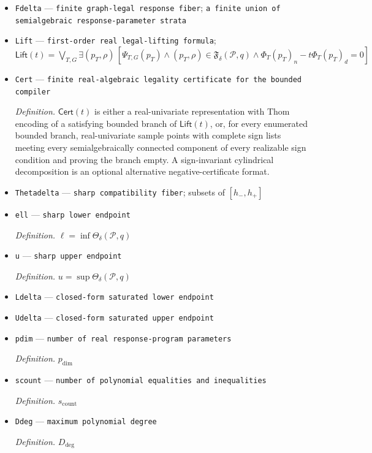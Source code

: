 \documentclass{article}
\begin{document}
\begin{itemize}
  \item \texttt{Fdelta} --- \texttt{finite graph-\allowbreak{}legal response fiber}; \texttt{a finite union of semialgebraic response-\allowbreak{}parameter strata}
  \item \texttt{Lift} --- \texttt{first-\allowbreak{}order real legal-\allowbreak{}lifting formula}; \(\mathsf{Lift}(t)=\bigvee_{T,G}\exists(p_T,\rho)\,[\Psi_{T,G}(p_T)\wedge(p_T,\rho)\in\mathfrak F_\delta(\mathcal P,q)\wedge\Phi_T(p_T)_n-t\Phi_T(p_T)_d=0]\)
  \item \texttt{Cert} --- \texttt{finite real-\allowbreak{}algebraic legality certificate for the bounded compiler}
  \par\smallskip\noindent\emph{Definition.} \(\mathsf{Cert}(t)\) is either a real-univariate representation with Thom encoding of a satisfying bounded branch of \(\mathsf{Lift}(t)\), or, for every enumerated bounded branch, real-univariate sample points with complete sign lists meeting every semialgebraically connected component of every realizable sign condition and proving the branch empty.  A sign-invariant cylindrical decomposition is an optional alternative negative-certificate format.
  \item \texttt{Thetadelta} --- \texttt{sharp compatibility fiber}; subsets of \([h_-,h_+]\)
  \item \texttt{ell} --- \texttt{sharp lower endpoint}
  \par\smallskip\noindent\emph{Definition.} \(\ell=\inf\Theta_\delta(\mathcal P,q)\)
  \item \texttt{u} --- \texttt{sharp upper endpoint}
  \par\smallskip\noindent\emph{Definition.} \(u=\sup\Theta_\delta(\mathcal P,q)\)
  \item \texttt{Ldelta} --- \texttt{closed-\allowbreak{}form saturated lower endpoint}
  \item \texttt{Udelta} --- \texttt{closed-\allowbreak{}form saturated upper endpoint}
  \item \texttt{pdim} --- \texttt{number of real response-\allowbreak{}program parameters}
  \par\smallskip\noindent\emph{Definition.} \(p_{\mathrm{dim}}\)
  \item \texttt{scount} --- \texttt{number of polynomial equalities and inequalities}
  \par\smallskip\noindent\emph{Definition.} \(s_{\mathrm{count}}\)
  \item \texttt{Ddeg} --- \texttt{maximum polynomial degree}
  \par\smallskip\noindent\emph{Definition.} \(D_{\mathrm{deg}}\)

\end{itemize}
\end{document}

